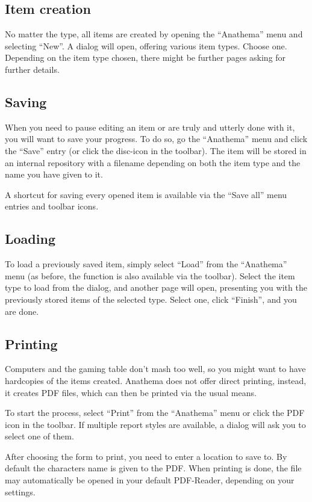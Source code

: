 \subsection{Item creation}
No matter the type, all items are created by opening the ``Anathema'' menu and selecting ``New''. A dialog will open, offering various item types. Choose one. Depending on the item type chosen, there might be further pages asking for further details.

\subsection{Saving}
When you need to pause editing an item or are truly and utterly done with it, you will want to save your progress. To do so, go the ``Anathema'' menu and click the ``Save'' entry (or click the disc-icon in the toolbar). The item will be stored in an internal repository with a filename depending on both the item type and the name you have given to it. 

A shortcut for saving every opened item is available via the ``Save all'' menu entries and toolbar icons.

\subsection{Loading}
To load a previously saved item, simply select ``Load'' from the ``Anathema'' menu (as before, the function is also available via the toolbar). Select the item type to load from the dialog, and another page will open, presenting you with the previously stored items of the selected type. Select one, click ``Finish'', and you are done.

\subsection{Printing}
Computers and the gaming table don't mash too well, so you might want to have hardcopies of the items created. Anathema does not offer direct printing, instead, it creates PDF files, which can then be printed via the usual means.

To start the process, select "`Print"' from the "`Anathema"' menu or click the PDF icon in the toolbar. If multiple report styles are available, a dialog will ask you to select one of them. 

After choosing the form to print, you need to enter a location to save to. By default the characters name is given to the PDF. When printing is done, the file may automatically be opened in your default PDF-Reader, depending on your settings.